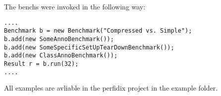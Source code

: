 \documentclass[12pt]{article}
\begin{document}
\newpage
The benchs were invoked in the following way:
 \begin{lstlisting}[caption=Perfidix 2.0]
 ....
Benchmark b = new Benchmark("Compressed vs. Simple");
b.add(new SomeAnnoBenchmark());
b.add(new SomeSpecificSetUpTearDownBenchmark());
b.add(new ClassAnnoBenchmark());
Result r = b.run(32);
....
\end{lstlisting}



 
 
 All examples are avliable in the perfidix project in the example folder.

 
\end{document}
